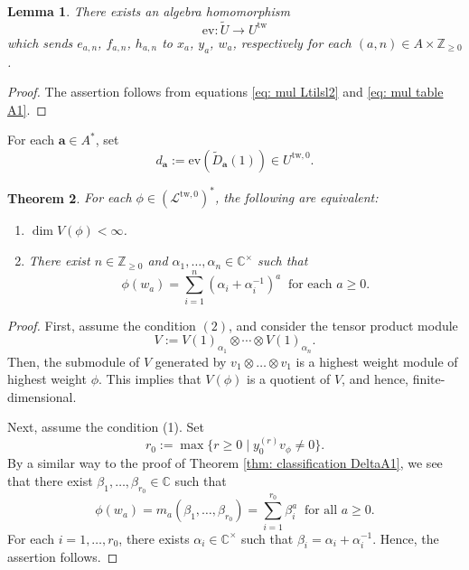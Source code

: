 \documentclass[12pt,a4paper]{amsart}
\newtheorem{thm}{Theorem}[subsection]
\newtheorem{lem}[thm]{Lemma}
\theoremstyle{definition}
\numberwithin{equation}{subsection}
\begin{document}
\begin{lem}
  There exists an algebra homomorphism
  \[
    \mathrm{ev} : \tilde{U} \to U^{\mathrm{tw}}
  \]
  which sends $e_{a,n}$, $f_{a,n}$, $h_{a,n}$ to $x_a$, $y_a$, $w_a$, respectively for each $(a,n) \in A \times \mathbb{Z}_{\geq 0}$.
\end{lem}
\begin{proof}
  The assertion follows from equations \eqref{eq: mul Ltilsl2} and \eqref{eq: mul table A1}.
\end{proof}

For each $\mathbf{a} \in A^*$, set
\[
  d_\mathbf{a} := \mathrm{ev}(\tilde{D}_\mathbf{a}(1)) \in U^{\mathrm{tw}, 0}.
\]

\begin{thm}\label{thm: classification A1}
  For each $\phi \in (\mathcal{L}^{\mathrm{tw},0})^*$, the following are equivalent:
  \begin{enumerate}
    \item $\dim V(\phi) < \infty$.
    \item There exist $n \in \mathbb{Z}_{\geq 0}$ and $\alpha_1,\dots,\alpha_n \in \mathbb{C}^\times$ such that
    \[
      \phi(w_a) = \sum_{i=1}^n (\alpha_i+\alpha_i^{-1})^a \ \text{ for each } a \geq 0.
    \]
  \end{enumerate}
\end{thm}
\begin{proof}
  First, assume the condition $(2)$, and consider the tensor product module
  \[
    V := V(1)_{\alpha_1} \otimes \cdots \otimes V(1)_{\alpha_n}.
  \]
  Then, the submodule of $V$ generated by $v_1 \otimes \dots \otimes v_1$ is a highest weight module of highest weight $\phi$.
  This implies that $V(\phi)$ is a quotient of $V$, and hence, finite-dimensional.

  Next, assume the condition (1).
  Set
  \[
    r_0 := \max\{ r \geq 0 \mid y_0^{(r)} v_\phi \neq 0 \}.
  \]
  By a similar way to the proof of Theorem \ref{thm: classification DeltaA1}, we see that there exist $\beta_1,\dots,\beta_{r_0} \in \mathbb{C}$ such that
  \[
    \phi(w_a) = m_a(\beta_1,\dots,\beta_{r_0}) = \sum_{i=1}^{r_0} \beta_i^a \ \text{ for all } a \geq 0.
  \]
  For each $i = 1,\dots,r_0$, there exists $\alpha_i \in \mathbb{C}^\times$ such that $\beta_i = \alpha_i + \alpha_i^{-1}$.
  Hence, the assertion follows.
\end{proof}
\end{document}
